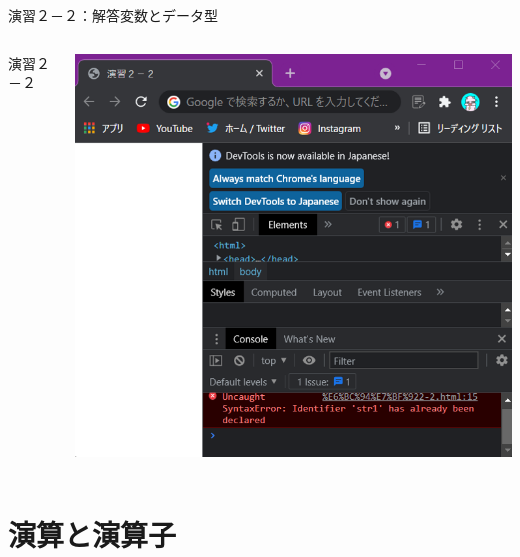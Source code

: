 \documentclass[dvipdfmx]{beamer}
\begin{document}
  \begin{frame}{演習２－２：解答}{変数とデータ型}
    \begin{columns}
      \begin{column}{0.41\textwidth}
        \begin{exampleblock}{演習２－２}
          
        \end{exampleblock}
      \end{column}
      \begin{column}{0.6\textwidth}
        \includegraphics[width=\textwidth]{pic/Chap2/pic3.png}
      \end{column}
    \end{columns}
  \end{frame}
  
\section*{演算と演算子}
  \begin{frame}
    \label{enzan}
    \sectionpage
  \end{frame}
  
\end{document}
